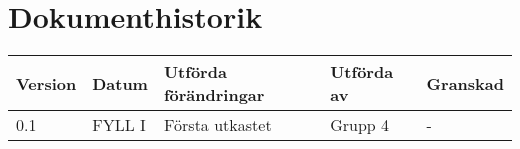 \documentclass[11pt]{article}
\begin{document}
\tableofcontents

\pagebreak

\section*{Dokumenthistorik}
\begin{table}[h]
\begin{tabular}{|l|l|l|l|l|} \hline

\textbf{Version} & \textbf{Datum} & \textbf{Utförda förändringar} & \textbf{Utförda av} & \textbf{Granskad} \\ \hline
0.1 & FYLL I &  Första utkastet & Grupp 4 & - \\ \hline
\end{tabular}
\end{table}

\pagebreak
{}
\end{document}
